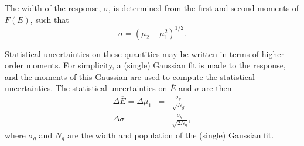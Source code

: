The width of the response, $\sigma$, is determined from the first and second moments of $F(E)$, such that
\begin{equation}
\sigma = \left( \mu_2 - \mu_1^2 \right)^{1/2}.
\label{DG_width_def}
\end{equation}

Statistical uncertainties on these quantities may be written in terms of higher order moments. For simplicity, a (single) Gaussian fit is made to the response, and the moments of this Gaussian are used to compute the statistical uncertainties. The statistical uncertainties on $\overline{E}$ and $\sigma$ are then
\begin{eqnarray}
\Delta \overline{E} = \Delta \mu_1 & = & \frac{\sigma_g}{\sqrt{N_g}} \\
\Delta \sigma & = & \frac{\sigma_g}{\sqrt{2N_g}},
\end{eqnarray}
where $\sigma_g$ and $N_g$ are the width and population of the (single) Gaussian fit.




